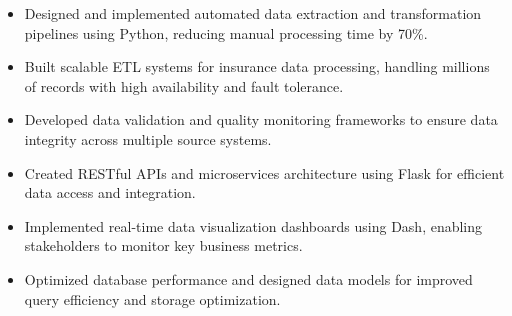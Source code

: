 \documentclass[10pt,a4paper,ragged2e,withhyper]{altacv}
\begin{document}
\begin{itemize}[noitemsep]
    \item Designed and implemented automated data extraction and transformation pipelines using Python, reducing manual processing time by 70\%.
    \item Built scalable ETL systems for insurance data processing, handling millions of records with high availability and fault tolerance.
    \item Developed data validation and quality monitoring frameworks to ensure data integrity across multiple source systems.
    \item Created RESTful APIs and microservices architecture using Flask for efficient data access and integration.
    \item Implemented real-time data visualization dashboards using Dash, enabling stakeholders to monitor key business metrics.
    \item Optimized database performance and designed data models for improved query efficiency and storage optimization.
\end{itemize}
\end{document}

